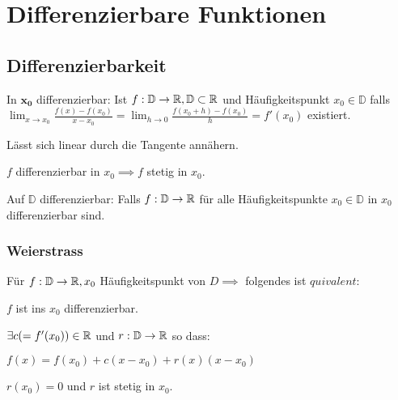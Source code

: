 
\section{Differenzierbare Funktionen}
\subsection{Differenzierbarkeit}
\begin{compactdesc}
    \item[In $\mathbf{x_0}$ differenzierbar:] Ist $f: \mathbb{D} \to \mathbb{R}, \mathbb{D} \subset \mathbb{R}$ und  Häufigkeitspunkt $x_0 \in \mathbb{D}$ falls $\lim_{x \to x_0} \frac{f(x) - f(x_0)}{x - x_0} = \lim_{h \to 0} \frac{f(x_0 + h) - f(x_0)}{h} = f'(x_0)$ existiert.
        \begin{compactitem}
            \item Lässt sich linear durch die Tangente annähern.
            \item $f$ differenzierbar in $x_0 \implies f$ stetig in $x_0$.
        \end{compactitem}
    \item[Auf $\mathbb{D}$ differenzierbar:] Falls $f : \mathbb{D} \to \mathbb{R}$ für alle Häufigkeitspunkte $x_0 \in \mathbb{D}$ in $x_0$ differenzierbar sind.
\end{compactdesc}

\subsubsection{Weierstrass}
Für $f: \mathbb{D} \to \mathbb{R}, x_0$ Häufigkeitspunkt von $D \implies$ folgendes ist $quivalent$:
\begin{compactenum}
    \item $f$ ist ins $x_0$ differenzierbar.
    \item $\exists c (=f'(x_0)) \in \mathbb{R}$ und $r: \mathbb{D} \to \mathbb{R}$ so dass:
        \begin{compactenum}
            \item $f(x) = f(x_0) + c(x - x_0) + r(x)(x - x_0)$
            \item $r(x_0) = 0$ und $r$ ist stetig in $x_0$.
        \end{compactenum}
\end{compactenum}

